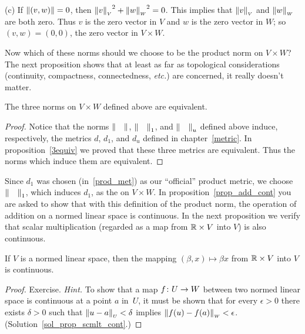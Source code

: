 (c) If $\lVert(v,w)\rVert = 0$, then ${{\lVert v\rVert}_{{\scriptscriptstyle{V}}}}^2 + {{\lVert w\rVert}_{{\scriptscriptstyle{W}}}}^2 = 0$. This
implies that ${\lVert v\rVert}_{{\scriptscriptstyle{V}}}$ and ${\lVert w\rVert}_{{\scriptscriptstyle{W}}}$ are both zero. Thus $v$ is the
zero vector in $V$ and $w$ is the zero vector in $W$; so $(v,w) = (0,0)$, the zero vector in
$V \times W$.

Now which of these norms should we choose to be the product norm on $V \times W$?  The next
proposition shows that at least as far as topological considerations (continuity, compactness,
connectedness, \emph{etc.}) are concerned, it really doesn't matter.

\begin{prop}  The three norms on $V \times W$ defined above are equivalent.
\end{prop}

\begin{proof} Notice that the norms $\lVert\quad\rVert$, ${\lVert\quad\rVert}_1$, and ${\lVert\quad\rVert}_u$
defined above induce, respectively, the metrics $d$, $d_1$, and $d_u$ defined in
chapter~\ref{metric}.  In proposition~\ref{3equiv} we proved that these three metrics are
equivalent. Thus the norms which induce them are equivalent.
\end{proof}


\begin{defn} Since $d_1$ was chosen (in~\ref{prod_met}) as our ``official'' product metric, we
choose ${\lVert\quad\rVert}_1$, which induces $d_1$, as the
 on $V \times W$. In proposition~\ref{prop_add_cont} you are asked to show
that with this definition of the product norm, the operation of addition on a normed linear
space is continuous.  In the next proposition we verify that scalar multiplication (regarded
as a map from $\mathbb{R} \times V$ into $V$) is also continuous.
\end{defn}

\begin{prop}\label{prop_scmlt_cont}  If $V$ is a normed linear space, then the mapping
$(\beta,x) \mapsto \beta x$ from $\mathbb{R} \times V$ into $V$ is continuous.
\end{prop}

\begin{proof}  Exercise. \emph{Hint.}  To show that a map $f\colon U \rightarrow W$ between two normed
linear space is continuous at a point $a$ in~$U$, it must be shown that for every $\epsilon >
0$ there exists $\delta > 0$ such that ${\lVert u - a\rVert}_{{\scriptscriptstyle{U}}} < \delta$ implies
${\lVert f(u) - f(a)\rVert}_{{\scriptscriptstyle{W}}} < \epsilon$.   (Solution~\ref{sol_prop_scmlt_cont}.)  \ns
\end{proof}

